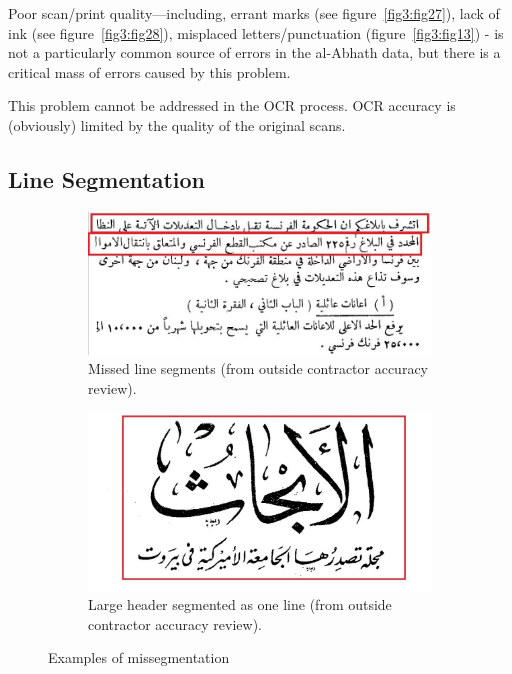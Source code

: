 Poor scan/print quality—including, errant marks (see figure~\ref{fig3:fig27}), lack of ink
(see figure~\ref{fig3:fig28}), misplaced letters/punctuation (figure~\ref{fig3:fig13}) - is not a
particularly common source of errors in the al-Abhath data, but there is a
critical mass of errors caused by this problem.

This problem cannot be addressed in the OCR process. OCR accuracy is
(obviously) limited by the quality of the original scans.

\subsection{Line Segmentation}

\begin{figure}[H]
	\centering
	\begin{subfigure}[b]{0.48\linewidth}
	\centering
	\includegraphics[height=0.1\textheight]{images/image16.jpg}
	\caption{Missed line segments (from outside contractor accuracy review).}
	\label{fig3:fig29}
	\end{subfigure}
	\begin{subfigure}[b]{0.48\linewidth}
	\centering
	\includegraphics[height=0.1\textheight]{images/image17.jpg}
	\caption{Large header segmented as one line (from outside contractor accuracy review).}
	\label{fig3:fig30}
	\end{subfigure}
	\caption{Examples of missegmentation}
	\label{fig3:fig2930}
\end{figure} 

